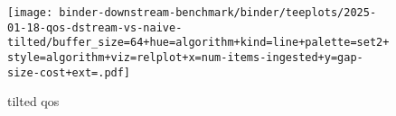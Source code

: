 \begin{figure}
\texttt{[image: binder-downstream-benchmark/binder/teeplots/2025-01-18-qos-dstream-vs-naive-tilted/buffer\_size=64+hue=algorithm+kind=line+palette=set2+style=algorithm+viz=relplot+x=num-items-ingested+y=gap-size-cost+ext=.pdf]}
\caption{tilted qos}
\label{fig:tilted-qos}
\end{figure}

